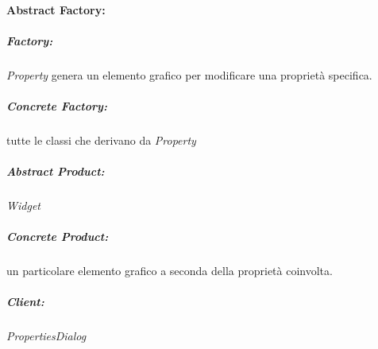\paragraph{Abstract Factory:} 
\subparagraph{Factory:} \textit{Property} genera un elemento grafico per modificare una propriet\`a specifica.
\subparagraph{Concrete Factory:} tutte le classi che derivano da \textit{Property}
\subparagraph{Abstract Product:} \textit{Widget}
\subparagraph{Concrete Product:} un particolare elemento grafico a seconda della propriet\`a coinvolta.
\subparagraph{Client:} \textit{PropertiesDialog}
\newpage

